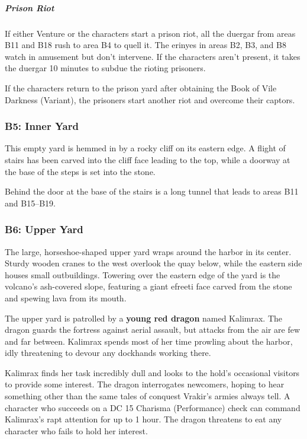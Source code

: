 \documentclass[10pt,a4paper,twoside,bg=print,twocolumn,openany,nodeprecatedcode]{dndbook}
\begin{document}
\subparagraph{Prison Riot}
If either Venture or the characters start a prison riot, all the duergar from areas B11 and B18 rush to area B4 to quell it. The erinyes in areas B2, B3, and B8 watch in amusement but don't intervene. If the characters aren't present, it takes the duergar 10 minutes to subdue the rioting prisoners.

If the characters return to the prison yard after obtaining the Book of Vile Darkness (Variant), the prisoners start another riot and overcome their captors.

\subsubsection{B5: Inner Yard}
\begin{DndReadAloud}{}
This empty yard is hemmed in by a rocky cliff on its eastern edge. A flight of stairs has been carved into the cliff face leading to the top, while a doorway at the base of the steps is set into the stone.

\end{DndReadAloud}

Behind the door at the base of the stairs is a long tunnel that leads to areas B11 and B15–B19.

\subsubsection{B6: Upper Yard}
\begin{DndReadAloud}{}
The large, horseshoe-shaped upper yard wraps around the harbor in its center. Sturdy wooden cranes to the west overlook the quay below, while the eastern side houses small outbuildings. Towering over the eastern edge of the yard is the volcano's ash-covered slope, featuring a giant efreeti face carved from the stone and spewing lava from its mouth.

\end{DndReadAloud}

The upper yard is patrolled by a \textbf{young red dragon} named Kalimrax. The dragon guards the fortress against aerial assault, but attacks from the air are few and far between. Kalimrax spends most of her time prowling about the harbor, idly threatening to devour any dockhands working there.

Kalimrax finds her task incredibly dull and looks to the hold's occasional visitors to provide some interest. The dragon interrogates newcomers, hoping to hear something other than the same tales of conquest Vrakir's armies always tell. A character who succeeds on a DC 15 Charisma (Performance) check can command Kalimrax's rapt attention for up to 1 hour. The dragon threatens to eat any character who fails to hold her interest.
\end{document}
